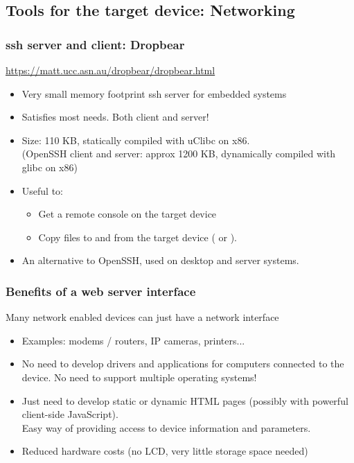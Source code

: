 \subsection[Networking tools]{Tools for the target device: Networking}

\begin{frame}
  \frametitle{ssh server and client: Dropbear}
  \url{https://matt.ucc.asn.au/dropbear/dropbear.html}
  \begin{itemize}
  \item Very small memory footprint ssh server for embedded systems
  \item Satisfies most needs. Both client and server!
  \item Size: 110 KB, statically compiled with uClibc on x86.\\
    (OpenSSH client and server: approx 1200 KB, dynamically compiled
    with glibc on x86)
  \item Useful to:
    \begin{itemize}
    \item Get a remote console on the target device
    \item Copy files to and from the target device ( or
      ).
    \end{itemize}
  \item An alternative to OpenSSH, used on desktop and server systems.
  \end{itemize}
\end{frame}

\begin{frame}
  \frametitle{Benefits of a web server interface}

  Many network enabled devices can just have a network interface

  \begin{itemize}
  \item Examples: modems / routers, IP cameras, printers...
  \item No need to develop drivers and applications for computers
    connected to the device. No need to support multiple operating
    systems!
  \item Just need to develop static or dynamic HTML pages (possibly
    with powerful client-side JavaScript).\\
    Easy way of providing access to device information and parameters.
  \item Reduced hardware costs (no LCD, very little storage space
    needed)
  \end{itemize}
\end{frame}

